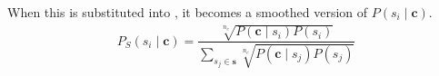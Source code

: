 \documentclass{article} %
\renewcommand{\c}{\mathbf{c}}
\newcommand{\s}{\mathbf{s}}
\providecommand{\DIFaddbegin}{} %
\providecommand{\DIFdelbegin}{} %
\providecommand{\DIFdelend}{} %
\begin{document}
When this is substituted into , it becomes a smoothed version of $P(s_{i} \mid \c)$.
\DIFdelbegin %
\DIFdelend \DIFaddbegin \begin{equation} \label{eq:generalwsdsmoothed}
\begin{aligned}
P_S(s_{i}\mid\c) %
%
=\dfrac{\sqrt[n_c]{P(\c\mid s_{i})P(s_{i})}}
{\sum_{s_{j}\in\s} \sqrt[n_c]{P(\c \mid s_{j})P(s_{j})}} \\
%
\end{aligned}
\end{equation}
\end{document}
